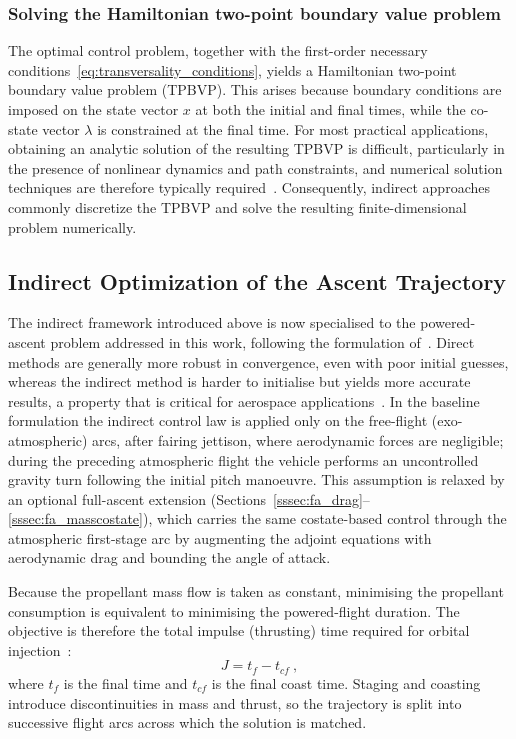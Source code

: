 \subsubsection{Solving the Hamiltonian two-point boundary value problem}
The optimal control problem, together with the first-order necessary conditions~\ref{eq:transversality_conditions}, yields a Hamiltonian two-point boundary value problem (TPBVP). This arises because boundary conditions are imposed on the state vector $x$ at both the initial and final times, while the co-state vector $\lambda$ is constrained at the final time. For most practical applications, obtaining an analytic solution of the resulting TPBVP is difficult, particularly in the presence of nonlinear dynamics and path constraints, and numerical solution techniques are therefore typically required~\cite{Conway2012SurveyMethodsContinuousDynamicSystems}. Consequently, indirect approaches commonly discretize the TPBVP and solve the resulting finite-dimensional problem numerically.


\subsection{Indirect Optimization of the Ascent Trajectory}
\label{ssec:indirect_ascent}

The indirect framework introduced above is now specialised to the powered-ascent problem addressed in this work, following the formulation of~\cite{Morgado2022_MultistagePrelimDesignTrajectoryOpt}. Direct methods are generally more robust in convergence, even with poor initial guesses, whereas the indirect method is harder to initialise but yields more accurate results, a property that is critical for aerospace applications~\cite{conway2010spacecraft}. In the baseline formulation the indirect control law is applied only on the free-flight (exo-atmospheric) arcs, after fairing jettison, where aerodynamic forces are negligible; during the preceding atmospheric flight the vehicle performs an uncontrolled gravity turn following the initial pitch manoeuvre. This assumption is relaxed by an optional full-ascent extension (Sections~\ref{sssec:fa_drag}--\ref{sssec:fa_masscostate}), which carries the same costate-based control through the atmospheric first-stage arc by augmenting the adjoint equations with aerodynamic drag and bounding the angle of attack.

Because the propellant mass flow is taken as constant, minimising the propellant consumption is equivalent to minimising the powered-flight duration. The objective is therefore the total impulse (thrusting) time required for orbital injection~\cite{Morgado2022_MultistagePrelimDesignTrajectoryOpt}:
\begin{equation}
J = t_f - t_{cf} \ ,
\label{eq:indirect_objective}
\end{equation}
where $t_f$ is the final time and $t_{cf}$ is the final coast time. Staging and coasting introduce discontinuities in mass and thrust, so the trajectory is split into successive flight arcs across which the solution is matched.

